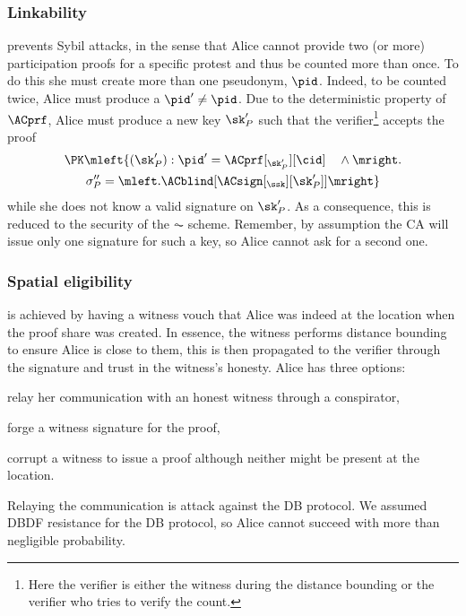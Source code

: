 \subsubsection{Linkability}%
\label{analysis-linkability}

 prevents Sybil attacks, in the sense
that Alice cannot provide two (or more) participation proofs for a
specific protest and thus be counted more than once.
To do this she must create more than one pseudonym, \(\pid\).
Indeed, to be counted twice, Alice must produce a \(\pid'\neq \pid\).
Due to the deterministic property of \(\ACprf\), Alice must produce a new key 
\(\sk_P'\) such that the verifier\footnote{%
  Here the verifier is either the witness during the distance bounding or the 
  verifier who tries to verify the count.
} accepts the proof
\begin{multline*}
\PK\mleft\{ (\sk_P') : \pid' = \ACprf[_{\sk_P'}][\cid] \quad \land \mright. \\
    \sigma_P'' = \mleft. \ACblind[\ACsign[_{\ssk}][\sk_P']] \mright\}
\end{multline*}
while she does not know a valid signature on \(\sk_P'\).
As a consequence, this is reduced to the security of the \(\AC\) scheme.
Remember, by assumption the \ac{CA} will issue only one signature for such a 
key, so Alice cannot ask for a second one.

\subsubsection{Spatial eligibility}%
\label{analysis-spatial}

 is achieved by having a witness vouch that Alice was 
indeed at the location when the proof share was created.
In essence, the witness performs distance bounding to ensure Alice is close to 
them, this is then propagated to the verifier through the signature and trust 
in the witness's honesty.
Alice has three options:
\begin{enumerate*}
\item\label{spatial-DF} relay her communication with an honest witness through 
  a conspirator,
\item\label{spatial-forge} forge a witness signature for the proof,
\item corrupt a witness to issue a proof although neither might be present at 
  the location.
\end{enumerate*}

Relaying the communication is  attack against the \ac{DB} protocol.
We assumed \ac{DBDF} resistance for the \ac{DB} protocol, so Alice cannot 
succeed with more than negligible probability.
 
